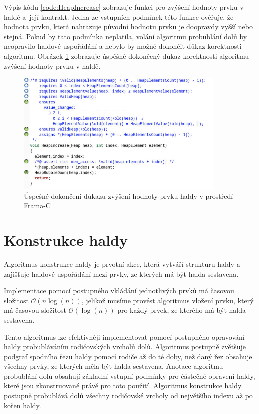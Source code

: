 Výpis kódu \ref{code:HeapIncrease} zobrazuje funkci pro zvýšení hodnoty prvku v haldě a~její kontrakt. Jedna ze vstupních podmínek této funkce ověřuje, že hodnota prvku, která nahrazuje původní hodnotu prvku je doopravdy vyšší nebo stejná. Pokud by tato podmínka neplatila, volání algoritmu probublání dolů by neopravilo haldové uspořádání a nebylo by možné dokončit důkaz korektnosti algoritmu. Obrázek \ref{img:F-C-HeapIncrease} zobrazuje úspěšně dokončený důkaz korektnosti algoritmu zvýšení hodnoty prvku v haldě.

\begin{figure}[H]
	\centering
	\includegraphics[width=10cm]{images/frama-c-HeapIncrease}
	\caption{Úspešné dokončení důkazu zvýšení hodnoty prvku haldy v prostředí Frama-C}
	\label{img:F-C-HeapIncrease}
\end{figure}


\section{Konstrukce haldy}
\label{subsec:HeapBuild}

Algoritmus konstrukce haldy je prvotní akce, která vytváří strukturu haldy a zajišťuje haldové uspořádání mezi prvky, ze kterých má být halda sestavena.

Implementace pomocí postupného vkládání jednotlivých prvků má časovou složitost $\mathcal{O}(n\log(n))$, jelikož musíme provést algoritmus vložení prvku, který má časovou složitost $\mathcal{O}(\log(n))$ pro každý prvek, ze kterého má být halda sestavena. \cite{IntroductionToAlgorithms2022}

Tento algoritmus lze efektivněji implementovat pomocí postupného opravování haldy probubláváním rodičovských vrcholů dolů. \cite{IntroductionToAlgorithms2022} Algoritmus postupně zvětšuje podgraf spodního řezu haldy pomocí rodiče až do té doby, než daný řez obsahuje všechny prvky, ze kterých měla být halda sestavena. Anotace algoritmu probublání dolů obsahují základní vstupní podmínky pro částečné opravení haldy, které jsou zkonstruované právě pro toto použití. Algoritmus konstrukce haldy postupně probublává dolů všechny rodičovské vrcholy od největšího indexu až po kořen haldy.

